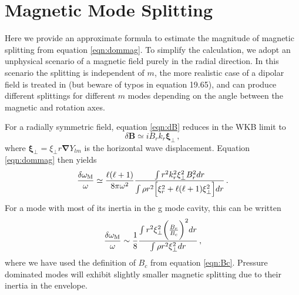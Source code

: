 \appendix

\section{Magnetic Mode Splitting}
\label{magmode}

Here we provide an approximate formula to estimate the magnitude of magnetic splitting from equation \ref{eqn:dommag}. To simplify the calculation, we adopt an unphysical scenario of a magnetic field purely in the radial direction. In this scenario the splitting is independent of $m$, the more realistic case of a dipolar field is treated in \cite{Unno_1989} (but beware of typos in equation 19.65), and can produce different splittings for different $m$ modes depending on the angle between the magnetic and rotation axes.

For a radially symmetric field, equation \ref{eqn:dB} reduces in the WKB limit to 
\begin{equation}
\delta {\boldsymbol B} \simeq i B_r k_r \boldsymbol{\xi}_\perp \, ,
\end{equation}
where $\boldsymbol{\xi}_\perp = \xi_\perp r \boldsymbol{\nabla} Y_{lm}$ is the horizontal wave displacement. Equation \ref{eqn:dommag} then yields
\begin{equation}
\label{eqn:dommag2}
\frac{\delta \omega_{\rm M}}{\omega} \simeq \frac{\ell(\ell+1)}{8 \pi \omega^2 } \frac{\int r^2 k_r^2 \xi_\perp^2 B_r^2 d r }{\int  \rho r^2 \Big[ \xi_r^2 + \ell(\ell+1) \xi_\perp^2 \Big] d r }\, .
\end{equation}
For a mode with most of its inertia in the g mode cavity, this can be written 
\begin{equation}
\label{eqn:dommag3}
\frac{\delta \omega_{\rm M}}{\omega} \sim \frac{1}{8} \frac{\int r^2 \xi_\perp^2 \bigg(\frac{B_r}{B_c}\bigg)^2 d r }{\int \rho r^2 \xi_\perp^2 d r }\, ,
\end{equation}
where we have used the definition of $B_c$ from equation \ref{eqn:Bc}. Pressure dominated modes will exhibit slightly smaller magnetic splitting due to their inertia in the envelope.


